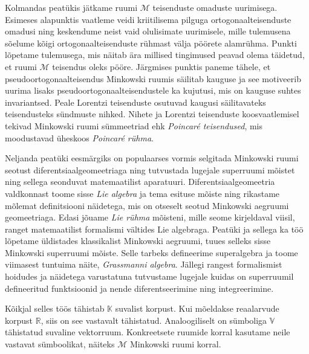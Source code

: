 \documentclass[12pt]{article}
\theoremstyle{plain}
\theoremstyle{definition}
\numberwithin{equation}{section}
\def\R{{\mathbb R}}
\def\K{{\mathbb K}}
\def\V{{\mathbb V}}
\def\M{{\mathcal M}}
\begin{document}
Kolmandas peatükis jätkame ruumi $\M$ teisenduste omaduste 
uurimisega. Esimeses alapunktis vaatleme veidi 
kriitilisema pilguga ortogonaalteisenduste omadusi ning 
keskendume neist vaid olulisimate uurimisele, mille 
tulemusena sõelume kõigi ortogonaalteisenduste rühmast välja 
pöörete alamrühma. Punkti lõpetame tulemusega, mis näitab 
ära millised tingimused peavad olema täidetud, et ruumi 
$\M$ teisendus oleks pööre. Järgmises punktis paneme tähele, 
et pseudoortogonaalteisendus Minkowski ruumis 
säilitab kauguse ja see motiveerib uurima lisaks 
pseudoortogonaalteisendustele ka kujutusi, mis on kauguse 
suhtes invariantsed. Peale Lorentzi teisenduste osutuvad 
kaugusi säilitavateks teisendusteks sündmuste nihked. Nihete 
ja Lorentzi teisenduste koosvaatlemisel tekivad Minkowski 
ruumi sümmeetriad ehk \emph{Poincar\'e teisendused}, mis 
moodustavad üheskoos \emph{Poincar\'e rühma}.

Neljanda peatüki eesmärgiks on populaarses vormis selgitada 
Minkowski ruumi seotust diferentsiaalgeomeetriaga ning 
tutvustada lugejale superruumi mõistet ning sellega seonduvat 
matemaatilist aparatuuri. Diferentsiaalgeomeetria valdkonnast 
toome sisse \emph{Lie algebra} ja tema esituse mõiste ning 
rikastame mõlemat definitsiooni näidetega, mis on otseselt 
seotud Minkowski aegruumi geomeetriaga. Edasi jõuame 
\emph{Lie rühma} mõisteni, mille seome kirjeldaval viisil, 
ranget matemaatilist formalismi vältides Lie algebraga. 
Peatüki ja sellega ka töö lõpetame üldistades klassikalist 
Minkowski aegruumi, tuues selleks sisse Minkowski superruumi 
mõiste. Selle tarbeks defineerime superalgebra ja toome 
viimasest tuntuima näite, \emph{Grassmanni algebra}. Jällegi 
rangest formalismist hoidudes ja näidetega varustatuna 
tutvustame lugejale kuidas on superruumil defineeritud 
funktsioonid ja nende diferentseerimine ning integreerimine.

Kõikjal selles töös tähistab $\K$ suvalist korpust. Kui 
mõeldakse reaalarvude korpust $\R$, siis on see vastavalt 
tähistatud. Analoogiliselt on sümboliga $\V$ tähistatud 
suvaline vektorruum. Konkreetsete ruumide korral kasutame 
neile vastavat süm\-boolikat, näiteks $\M$ Minkowski ruumi 
korral.
\end{document}
